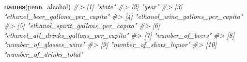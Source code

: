 \documentclass[
  12pt,
]{book}
\newenvironment{Shaded}{\begin{snugshade}}{\end{snugshade}}
\newcommand{\CommentTok}[1]{\textcolor[rgb]{0.37,0.37,0.37}{\textit{#1}}}
\newcommand{\KeywordTok}[1]{\textcolor[rgb]{0.27,0.27,0.27}{\textbf{#1}}}
\newcommand{\NormalTok}[1]{#1}
\begin{document}
\begin{Shaded}
\begin{Highlighting}[]
\KeywordTok{names}\NormalTok{(penn\_alcohol)}
\CommentTok{\#\textgreater{}  [1] "state"                                }
\CommentTok{\#\textgreater{}  [2] "year"                                 }
\CommentTok{\#\textgreater{}  [3] "ethanol\_beer\_gallons\_per\_capita"      }
\CommentTok{\#\textgreater{}  [4] "ethanol\_wine\_gallons\_per\_capita"      }
\CommentTok{\#\textgreater{}  [5] "ethanol\_spirit\_gallons\_per\_capita"    }
\CommentTok{\#\textgreater{}  [6] "ethanol\_all\_drinks\_gallons\_per\_capita"}
\CommentTok{\#\textgreater{}  [7] "number\_of\_beers"                      }
\CommentTok{\#\textgreater{}  [8] "number\_of\_glasses\_wine"               }
\CommentTok{\#\textgreater{}  [9] "number\_of\_shots\_liquor"               }
\CommentTok{\#\textgreater{} [10] "number\_of\_drinks\_total"}
\end{Highlighting}
\end{Shaded}
\end{document}
